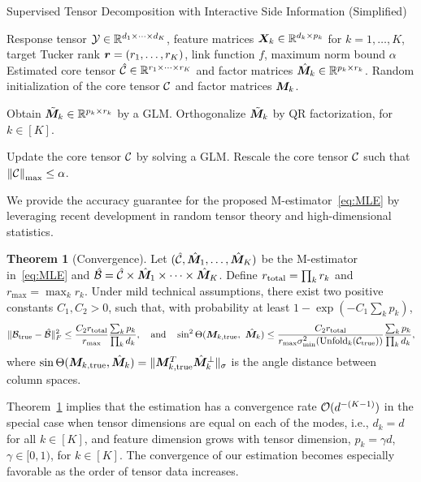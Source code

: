 \documentclass{article}
\theoremstyle{definition}
\newtheorem{thm}{Theorem}[section]
\theoremstyle{definition}
\begin{document}
\begin{algorithm}[!h]
\caption{Supervised Tensor Decomposition with Interactive Side Information (Simplified)}\label{alg:B}
\begin{algorithmic}[1]
\INPUT Response tensor $\mathcal{Y}\in \mathbb{R}^{d_1\times \cdots \times d_K}$, feature matrices $\bm X_k\in\mathbb{R}^{d_k\times p_k}$ for $k=1,\ldots,K$, target Tucker rank $\bm{r}=(r_1,\ldots,r_K)$, link function $f$, maximum norm bound $\alpha$
\OUTPUT Estimated core tensor $\hat {\mathcal{C}}\in\mathbb{R}^{r_1\times \cdots \times r_K}$ and factor matrices $\hat {\bm M}_k\in\mathbb{R}^{p_k\times r_k}$. 
\State Random initialization of the core tensor $\mathcal{C}$ and factor matrices $\bm M_k$. 

\State Obtain $\tilde {\bm M}_k\in\mathbb{R}^{p_k\times r_k}$ by a GLM. Orthogonalize $\tilde {\bm M}_k$ by QR factorization, for $k \in [K]$. 

\State Update the core tensor $\mathcal{C}$ by solving a GLM. Rescale the core tensor $\mathcal{C}$ such that $\left\lVert\mathcal{C}\right\rVert_{\max} \leq \alpha$. 
\EndWhile
\end{algorithmic}
\end{algorithm}

We provide the accuracy guarantee for the proposed M-estimator~\eqref{eq:MLE} by leveraging recent development in random tensor theory and high-dimensional statistics.
\begin{thm}[Convergence]\label{thm:main}
Let $(\hat {\mathcal{C}}, \hat {\bm M}_1,\ldots,\hat {\bm M}_K)$ be the M-estimator in~\eqref{eq:MLE} and $\hat {\mathcal{B}}=\hat {\mathcal{C}}\times \hat {\bm M}_1\times\cdots \times \hat {\bm M}_K$. Define $r_\textup{total}=\prod_k r_k$ and $r_{\max}=\max_k r_k$. Under mild technical assumptions, there exist two positive constants $C_1, C_2>0$, such that, with probability at least $1-\exp(-C_1\sum_k p_k)$, 
\begin{equation}\label{eq:bound}
    \lVert\mathcal{B}_{\textup{true}}- \hat {\mathcal{B}}\rVert_F^2\leq \frac{ C_{2} r_{\textup{total}}}{r_{\max}}\frac{\sum_k p_k}{\prod_k d_k},\quad \text{and}\quad
\sin^2 \Theta(\bm M_{k,\textup{true}},\ \hat {\bm M}_k) \leq  \frac{ C_{2}r_{\textup{total}}}{ r_{\max}\sigma^2_{\min}(\textup{Unfold}_k(\mathcal{C}_\textup{true}))}\frac{\sum_k p_k}{\prod_k d_k},
\end{equation}
where $\sin \Theta(\bm M_{k,\textup{true}},\hat {\bm M}_k)=\lVert\bm M_{k,\textup{true}}^T \hat {\bm M}_k^{\perp}\rVert_\sigma$ is the angle distance between column spaces. 
\end{thm}
Theorem~\ref{thm:main} implies that the estimation has a convergence rate $\mathcal{O}(d^{-(K-1)})$ in the special case when tensor dimensions are equal on each of the modes, i.e., $d_k=d$ for all $k\in[K]$, and feature dimension grows with tensor dimension, $p_k=\gamma d$, $\gamma\in [0,1)$, for $k\in[K]$. The convergence of our estimation becomes especially favorable as the order of tensor data increases. 
\end{document}
